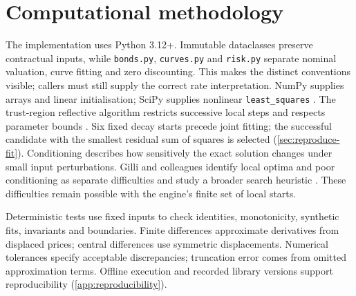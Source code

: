 \chapter{Computational methodology}\label{ch:computation}
\label{sec:arithmetic}\label{sec:optimiser}
The implementation uses Python 3.12+. Immutable dataclasses preserve contractual inputs, while \texttt{bonds.py}, \texttt{curves.py} and \texttt{risk.py} separate nominal valuation, curve fitting and zero discounting. This makes the distinct conventions visible; callers must still supply the correct rate interpretation. NumPy supplies arrays and linear initialisation; SciPy supplies nonlinear \texttt{least\_squares} \parencite{harris2020,virtanen2020}. The trust-region reflective algorithm restricts successive local steps and respects parameter bounds \parencite{scipyLeastSquares,branch1999,nocedal2006}. Six fixed decay starts precede joint fitting; the successful candidate with the smallest residual sum of squares is selected (\cref{sec:reproduce-fit}). Conditioning describes how sensitively the exact solution changes under small input perturbations. Gilli and colleagues identify local optima and poor conditioning as separate difficulties and study a broader search heuristic \parencite{gilli2010}. These difficulties remain possible with the engine's finite set of local starts.

\label{sec:test-method}\label{sec:tolerances}
Deterministic tests use fixed inputs to check identities, monotonicity, synthetic fits, invariants and boundaries. Finite differences approximate derivatives from displaced prices; central differences use symmetric displacements. Numerical tolerances specify acceptable discrepancies; truncation error comes from omitted approximation terms. Offline execution and recorded library versions support reproducibility (\cref{app:reproducibility}).
